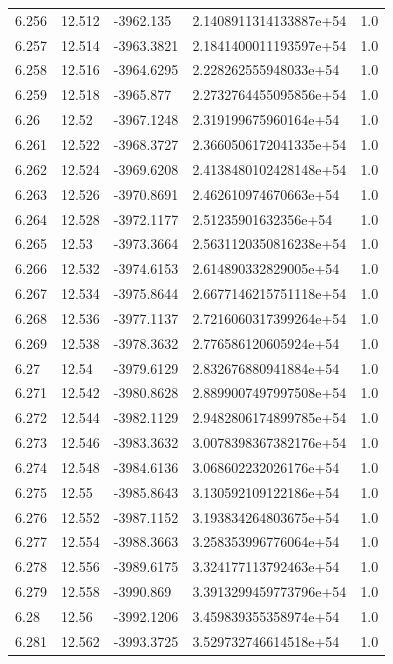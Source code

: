 \begin{tabular}{lllll}
6.256 & 12.512 & -3962.135 & 2.1408911314133887e+54 & 1.0 \\
6.257 & 12.514 & -3963.3821 & 2.1841400011193597e+54 & 1.0 \\
6.258 & 12.516 & -3964.6295 & 2.228262555948033e+54 & 1.0 \\
6.259 & 12.518 & -3965.877 & 2.2732764455095856e+54 & 1.0 \\
6.26 & 12.52 & -3967.1248 & 2.319199675960164e+54 & 1.0 \\
6.261 & 12.522 & -3968.3727 & 2.3660506172041335e+54 & 1.0 \\
6.262 & 12.524 & -3969.6208 & 2.4138480102428148e+54 & 1.0 \\
6.263 & 12.526 & -3970.8691 & 2.462610974670663e+54 & 1.0 \\
6.264 & 12.528 & -3972.1177 & 2.51235901632356e+54 & 1.0 \\
6.265 & 12.53 & -3973.3664 & 2.5631120350816238e+54 & 1.0 \\
6.266 & 12.532 & -3974.6153 & 2.614890332829005e+54 & 1.0 \\
6.267 & 12.534 & -3975.8644 & 2.6677146215751118e+54 & 1.0 \\
6.268 & 12.536 & -3977.1137 & 2.7216060317399264e+54 & 1.0 \\
6.269 & 12.538 & -3978.3632 & 2.776586120605924e+54 & 1.0 \\
6.27 & 12.54 & -3979.6129 & 2.832676880941884e+54 & 1.0 \\
6.271 & 12.542 & -3980.8628 & 2.8899007497997508e+54 & 1.0 \\
6.272 & 12.544 & -3982.1129 & 2.9482806174899785e+54 & 1.0 \\
6.273 & 12.546 & -3983.3632 & 3.0078398367382176e+54 & 1.0 \\
6.274 & 12.548 & -3984.6136 & 3.068602232026176e+54 & 1.0 \\
6.275 & 12.55 & -3985.8643 & 3.130592109122186e+54 & 1.0 \\
6.276 & 12.552 & -3987.1152 & 3.193834264803675e+54 & 1.0 \\
6.277 & 12.554 & -3988.3663 & 3.258353996776064e+54 & 1.0 \\
6.278 & 12.556 & -3989.6175 & 3.324177113792463e+54 & 1.0 \\
6.279 & 12.558 & -3990.869 & 3.3913299459773796e+54 & 1.0 \\
6.28 & 12.56 & -3992.1206 & 3.459839355358974e+54 & 1.0 \\
6.281 & 12.562 & -3993.3725 & 3.529732746614518e+54 & 1.0 \\

\end{tabular}
